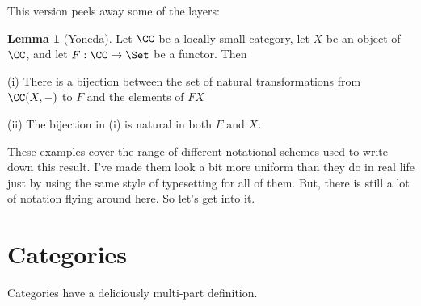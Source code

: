 \documentclass[12pt]{article}
\theoremstyle{definition}
\newtheorem{lemma}[thm]{Lemma}
\theoremstyle{definition}
\theoremstyle{definition}
\numberwithin{equation}{section}
\begin{document}
\noindent
This version peels away some of the layers:

\begin{lemma}[Yoneda]\label{yoneda6}
Let $\CC$ be a locally small category, let $X$ be an object of $\CC$, and let $F: \CC \to \Set$ be a functor. Then

(i) There is a bijection between the set of natural transformations from $\CC(X, -)$ to $F$ and the elements of $FX$

(ii) The bijection in (i) is natural in both $F$ and $X$.
\end{lemma}

\noindent
These examples cover the range of different notational schemes used to write down this result. I've made them look a bit more uniform than they do in real life just by using the same style of typesetting for all of them. But, there is still a lot of notation flying around here. So let's get into it.

\newpage

\section{Categories}

Categories have a deliciously multi-part definition.
\end{document}

